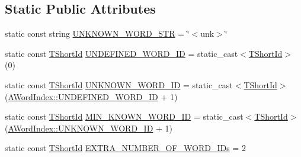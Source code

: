 \subsection*{Static Public Attributes}
\begin{DoxyCompactItemize}
\item 
static const string \hyperlink{classuva_1_1smt_1_1tries_1_1dictionary_1_1_a_word_index_a2059cfaea3b8d1253cafb9b3ccb1cc28}{U\+N\+K\+N\+O\+W\+N\+\_\+\+W\+O\+R\+D\+\_\+\+S\+T\+R} = \char`\"{}$<$unk$>$\char`\"{}
\item 
static const \hyperlink{namespaceuva_1_1smt_1_1hashing_adcf22e1982ad09d3a63494c006267469}{T\+Short\+Id} \hyperlink{classuva_1_1smt_1_1tries_1_1dictionary_1_1_a_word_index_ac88fb565f5b572fdac67d546c124cfa8}{U\+N\+D\+E\+F\+I\+N\+E\+D\+\_\+\+W\+O\+R\+D\+\_\+\+I\+D} = static\+\_\+cast$<$\hyperlink{namespaceuva_1_1smt_1_1hashing_adcf22e1982ad09d3a63494c006267469}{T\+Short\+Id}$>$ (0)
\item 
static const \hyperlink{namespaceuva_1_1smt_1_1hashing_adcf22e1982ad09d3a63494c006267469}{T\+Short\+Id} \hyperlink{classuva_1_1smt_1_1tries_1_1dictionary_1_1_a_word_index_a975e0ce3eb5986019ef5b67cff84806e}{U\+N\+K\+N\+O\+W\+N\+\_\+\+W\+O\+R\+D\+\_\+\+I\+D} = static\+\_\+cast$<$\hyperlink{namespaceuva_1_1smt_1_1hashing_adcf22e1982ad09d3a63494c006267469}{T\+Short\+Id}$>$ (\hyperlink{classuva_1_1smt_1_1tries_1_1dictionary_1_1_a_word_index_ac88fb565f5b572fdac67d546c124cfa8}{A\+Word\+Index\+::\+U\+N\+D\+E\+F\+I\+N\+E\+D\+\_\+\+W\+O\+R\+D\+\_\+\+I\+D} + 1)
\item 
static const \hyperlink{namespaceuva_1_1smt_1_1hashing_adcf22e1982ad09d3a63494c006267469}{T\+Short\+Id} \hyperlink{classuva_1_1smt_1_1tries_1_1dictionary_1_1_a_word_index_a5417a50c625a15ac1268139d18403b91}{M\+I\+N\+\_\+\+K\+N\+O\+W\+N\+\_\+\+W\+O\+R\+D\+\_\+\+I\+D} = static\+\_\+cast$<$\hyperlink{namespaceuva_1_1smt_1_1hashing_adcf22e1982ad09d3a63494c006267469}{T\+Short\+Id}$>$ (\hyperlink{classuva_1_1smt_1_1tries_1_1dictionary_1_1_a_word_index_a975e0ce3eb5986019ef5b67cff84806e}{A\+Word\+Index\+::\+U\+N\+K\+N\+O\+W\+N\+\_\+\+W\+O\+R\+D\+\_\+\+I\+D} + 1)
\item 
static const \hyperlink{namespaceuva_1_1smt_1_1hashing_adcf22e1982ad09d3a63494c006267469}{T\+Short\+Id} \hyperlink{classuva_1_1smt_1_1tries_1_1dictionary_1_1_a_word_index_abe32fedd03b6f72d38ecc88d47034b65}{E\+X\+T\+R\+A\+\_\+\+N\+U\+M\+B\+E\+R\+\_\+\+O\+F\+\_\+\+W\+O\+R\+D\+\_\+\+I\+Ds} = 2
\end{DoxyCompactItemize}


